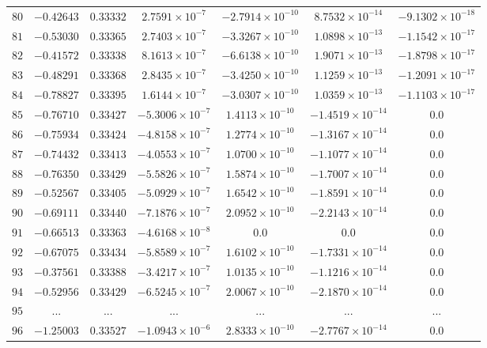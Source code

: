 \begin{landscape}
\begin{center}
\begin{longtable}{lcccccc}
$80$ & $-0.42643$ & $0.33332$ & $2.7591\times{}10^{-7}$ & $-2.7914\times{}10^{-10}$ & $8.7532\times{}10^{-14}$ & $-9.1302\times{}10^{-18}$ \\
$81$ & $-0.53030$ & $0.33365$ & $2.7403\times{}10^{-7}$ & $-3.3267\times{}10^{-10}$ & $1.0898\times{}10^{-13}$ & $-1.1542\times{}10^{-17}$ \\
$82$ & $-0.41572$ & $0.33338$ & $8.1613\times{}10^{-7}$ & $-6.6138\times{}10^{-10}$ & $1.9071\times{}10^{-13}$ & $-1.8798\times{}10^{-17}$ \\
$83$ & $-0.48291$ & $0.33368$ & $2.8435\times{}10^{-7}$ & $-3.4250\times{}10^{-10}$ & $1.1259\times{}10^{-13}$ & $-1.2091\times{}10^{-17}$ \\
$84$ & $-0.78827$ & $0.33395$ & $1.6144\times{}10^{-7}$ & $-3.0307\times{}10^{-10}$ & $1.0359\times{}10^{-13}$ & $-1.1103\times{}10^{-17}$ \\
$85$ & $-0.76710$ & $0.33427$ & $-5.3006\times{}10^{-7}$ & $1.4113\times{}10^{-10}$ & $-1.4519\times{}10^{-14}$ & $0.0$ \\
$86$ & $-0.75934$ & $0.33424$ & $-4.8158\times{}10^{-7}$ & $1.2774\times{}10^{-10}$ & $-1.3167\times{}10^{-14}$ & $0.0$ \\
$87$ & $-0.74432$ & $0.33413$ & $-4.0553\times{}10^{-7}$ & $1.0700\times{}10^{-10}$ & $-1.1077\times{}10^{-14}$ & $0.0$ \\
$88$ & $-0.76350$ & $0.33429$ & $-5.5826\times{}10^{-7}$ & $1.5874\times{}10^{-10}$ & $-1.7007\times{}10^{-14}$ & $0.0$ \\
$89$ & $-0.52567$ & $0.33405$ & $-5.0929\times{}10^{-7}$ & $1.6542\times{}10^{-10}$ & $-1.8591\times{}10^{-14}$ & $0.0$ \\
$90$ & $-0.69111$ & $0.33440$ & $-7.1876\times{}10^{-7}$ & $2.0952\times{}10^{-10}$ & $-2.2143\times{}10^{-14}$ & $0.0$ \\
$91$ & $-0.66513$ & $0.33363$ & $-4.6168\times{}10^{-8}$ & $0.0$ & $0.0$ & $0.0$ \\
$92$ & $-0.67075$ & $0.33434$ & $-5.8589\times{}10^{-7}$ & $1.6102\times{}10^{-10}$ & $-1.7331\times{}10^{-14}$ & $0.0$ \\
$93$ & $-0.37561$ & $0.33388$ & $-3.4217\times{}10^{-7}$ & $1.0135\times{}10^{-10}$ & $-1.1216\times{}10^{-14}$ & $0.0$ \\
$94$ & $-0.52956$ & $0.33429$ & $-6.5245\times{}10^{-7}$ & $2.0067\times{}10^{-10}$ & $-2.1870\times{}10^{-14}$ & $0.0$ \\
$95$ & ... & ... & ... & ... & ... & ... \\
$96$ & $-1.25003$ & $0.33527$ & $-1.0943\times{}10^{-6}$ & $2.8333\times{}10^{-10}$ & $-2.7767\times{}10^{-14}$ & $0.0$ \\

\end{longtable}
\end{center}
\end{landscape}
